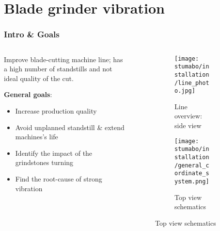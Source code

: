 \section{Blade grinder vibration}
\SectionPage

\begin{frame}
    \frametitle{Intro \& Goals}
    \vspace*{\fill}
    \begin{columns}[onlytextwidth, c]
        \begin{column}{.47\textwidth}
            Improve blade-cutting machine line; has a high number of standstills and not ideal quality of the cut.

            \textbf{General goals}:
            \begin{itemize}
                \item Increase production quality
                \item Avoid unplanned standstill \& extend machines's life
                \item Identify the impact of the grindstones turning
                \item Find the root-cause of strong vibration
            \end{itemize}
        \end{column}
        \begin{column}{.52\textwidth}
            \begin{figure}[ht]
                \begin{subfigure}{\textwidth}
                    \texttt{[image: stumabo/installation/line\_photo.jpg]}
                    \caption{Line overview: side view}
                    \label{fig:line_overview}
                \end{subfigure}
                \begin{subfigure}{\textwidth}
                    \texttt{[image: stumabo/installation/general\_cordinate\_system.png]}
                    \caption{Top view schematics}
                \end{subfigure}
            \end{figure}
        \end{column}
    \end{columns}
    \vspace*{\fill}
\end{frame}

